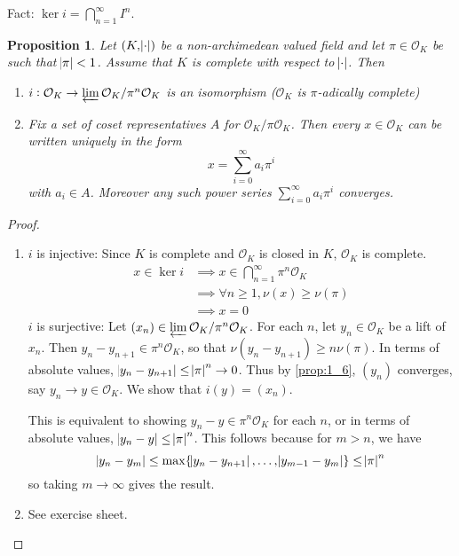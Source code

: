 \documentclass[12pt]{amsart}
\theoremstyle{definition}
\theoremstyle{plain}
\newtheorem{proposition}[definition]{Proposition}
\theoremstyle{remark}
\newcommand{\cO}{\mathcal{O}}
\begin{document}
\noindent Fact: $\ker{i} = \bigcap_{n=1}^\infty I^n$.

\begin{proposition}\label{prop:3_5}
    Let $(K, \abs{\cdot})$ be a non-archimedean valued field and let $\pi \in \cO_K$ be such that $\abs{\pi} < 1$. Assume that $K$ is complete with respect to $\abs{\cdot}$. Then
    \begin{enumerate}
        \item $i : \cO_K \to \varprojlim \cO_K / \pi^n \cO_K$ is an isomorphism ($\cO_K$ is $\pi$-adically complete)
        \item Fix a set of coset representatives $A$ for $\cO_K / \pi \cO_K$. Then every $x \in \cO_K$ can be written uniquely in the form
            \begin{equation*}
                x = \sum_{i=0}^\infty a_i \pi^i
            \end{equation*}
            with $a_i \in A$.
            Moreover any such power series $\sum_{i=0}^\infty a_i \pi^i$ converges.
    \end{enumerate}
\end{proposition}
\begin{proof}\phantom{}
    \begin{enumerate}
        \item $i$ is injective: Since $K$ is complete and $\cO_K$ is closed in $K$, $\cO_K$ is complete.
            \begin{align*}
                x \in \ker i
                &\implies x \in \bigcap_{n=1}^\infty \pi^n \cO_K\\
                &\implies \forall n \ge 1, \nu(x) \ge \nu(\pi)\\
                &\implies x = 0
            \end{align*}
            $i$ is surjective: Let $(x_n) \in \varprojlim \cO_K / \pi^n \cO_K$. For each $n$, let $y_n \in \cO_K$ be a lift of $x_n$. Then $y_n - y_{n+1} \in \pi^n \cO_K$, so that $\nu(y_n - y_{n+1}) \ge n \nu(\pi)$. In terms of absolute values, $\abs{y_n - y_{n+1}} \le \abs{\pi}^n \to 0$. Thus by \autoref{prop:1_6}, $(y_n)$ converges, say $y_n \to y \in \cO_K$. We show that $i(y) = (x_n)$.

            This is equivalent to showing $y_n - y \in \pi^n \cO_K$ for each $n$, or in terms of absolute values, $\abs{y_n - y} \le \abs{\pi}^n$. This follows because for $m > n$, we have
            \begin{equation*}
                \abs{y_n - y_m} \le \max\{\abs{y_n - y_{n+1}}, \ldots, \abs{y_{m-1} - y_m} \} \le \abs{\pi}^n
            \end{equation*}
            so taking $m \to \infty$ gives the result.

        \item See exercise sheet. \qedhere
    \end{enumerate}
\end{proof}
\end{document}
